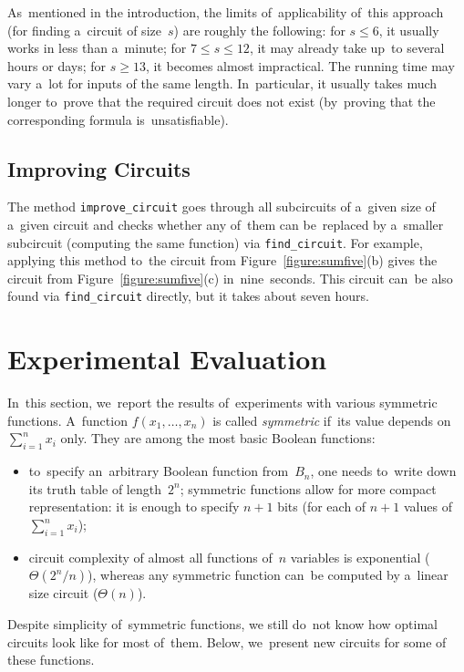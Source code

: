 \documentclass[12pt,letterpaper]{article}
\begin{document}
As~mentioned in the introduction, the limits 
of~applicability of~this approach (for finding a~circuit of size~$s$) are roughly the following:
for $s \le 6$, it usually works in less than a~minute;
for $7 \le s \le 12$, it may already take up~to 
several hours or days; for $s \ge 13$, it becomes almost impractical. The running time may vary a~lot
for inputs of the same length. In~particular,
it usually takes much longer to~prove that 
the required circuit does not exist (by~proving that the corresponding formula is~unsatisfiable).


\subsection{Improving Circuits}
The method \texttt{improve_circuit}
goes through all subcircuits of a~given size
of a~given circuit and checks whether any 
of~them can be~replaced by a~smaller subcircuit 
(computing the same function) via \texttt{find_circuit}. For example, applying this method 
to~the circuit from Figure~\ref{figure:sumfive}(b)
gives the circuit from Figure~\ref{figure:sumfive}(c)
in~nine~seconds. This circuit can~be also found via \texttt{find_circuit} directly, but it takes about seven hours.





\section{Experimental Evaluation}
In~this section, we~report the results of~experiments
with various symmetric functions. A~function $f(x_1,\dotsc,x_n)$ is called \emph{symmetric} if~its value depends on~$\sum_{i=1}^nx_i$ only. They are among the most basic Boolean functions:
\begin{itemize}
\item to~specify an~arbitrary Boolean function 
from~$B_n$, one needs
to~write down its truth table of length~$2^n$; symmetric functions allow for more compact representation: it is enough to specify $n+1$ bits (for each of $n+1$ values 
of~$\sum_{i=1}^nx_i$);
\item circuit complexity of almost all functions 
of~$n$ variables is exponential ($\Theta(2^n/n)$), whereas any symmetric function can~be computed by a~linear size circuit ($\Theta(n)$). 
\end{itemize}
Despite simplicity of~symmetric functions, we still do~not
know how optimal circuits look like for most of~them. Below, we~present new circuits for some of these functions.
\end{document}

